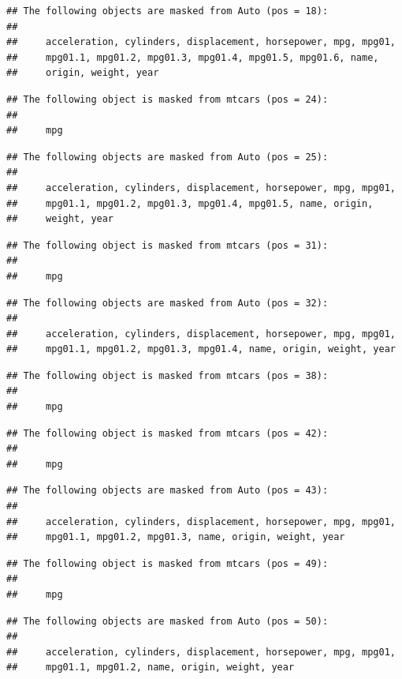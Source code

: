 \documentclass[]{book}
\begin{document}
\begin{verbatim}
## The following objects are masked from Auto (pos = 18):
## 
##     acceleration, cylinders, displacement, horsepower, mpg, mpg01,
##     mpg01.1, mpg01.2, mpg01.3, mpg01.4, mpg01.5, mpg01.6, name,
##     origin, weight, year
\end{verbatim}

\begin{verbatim}
## The following object is masked from mtcars (pos = 24):
## 
##     mpg
\end{verbatim}

\begin{verbatim}
## The following objects are masked from Auto (pos = 25):
## 
##     acceleration, cylinders, displacement, horsepower, mpg, mpg01,
##     mpg01.1, mpg01.2, mpg01.3, mpg01.4, mpg01.5, name, origin,
##     weight, year
\end{verbatim}

\begin{verbatim}
## The following object is masked from mtcars (pos = 31):
## 
##     mpg
\end{verbatim}

\begin{verbatim}
## The following objects are masked from Auto (pos = 32):
## 
##     acceleration, cylinders, displacement, horsepower, mpg, mpg01,
##     mpg01.1, mpg01.2, mpg01.3, mpg01.4, name, origin, weight, year
\end{verbatim}

\begin{verbatim}
## The following object is masked from mtcars (pos = 38):
## 
##     mpg
\end{verbatim}

\begin{verbatim}
## The following object is masked from mtcars (pos = 42):
## 
##     mpg
\end{verbatim}

\begin{verbatim}
## The following objects are masked from Auto (pos = 43):
## 
##     acceleration, cylinders, displacement, horsepower, mpg, mpg01,
##     mpg01.1, mpg01.2, mpg01.3, name, origin, weight, year
\end{verbatim}

\begin{verbatim}
## The following object is masked from mtcars (pos = 49):
## 
##     mpg
\end{verbatim}

\begin{verbatim}
## The following objects are masked from Auto (pos = 50):
## 
##     acceleration, cylinders, displacement, horsepower, mpg, mpg01,
##     mpg01.1, mpg01.2, name, origin, weight, year
\end{verbatim}
\end{document}
